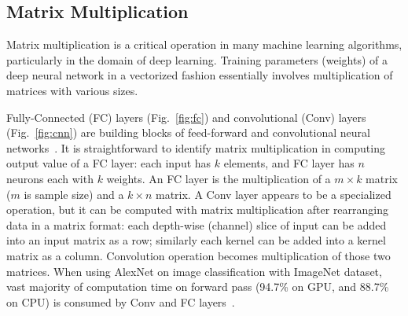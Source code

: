 \subsection{Matrix Multiplication}
Matrix multiplication is a critical operation in many machine learning algorithms, particularly in the domain of deep learning. Training parameters (weights) of a deep neural network in a vectorized fashion essentially involves multiplication of matrices with various sizes. 

Fully-Connected (FC) layers (Fig.~\ref{fig:fc}) and convolutional (Conv) layers (Fig.~\ref{fig:cnn}) are building blocks of feed-forward and convolutional neural networks~\cite{Warden15}. It is straightforward to identify matrix multiplication in computing output value of a FC layer: each input has $k$ elements, and FC layer has $n$ neurons each with $k$ weights. An FC layer is the multiplication of a $m \times k$ matrix ($m$ is sample size) and a $k\times n$ matrix. A Conv layer appears to be a specialized operation, but it can be computed with matrix multiplication after rearranging data in a matrix format: each depth-wise (channel) slice of input can be added into an input matrix as a row; similarly each kernel can be added into a kernel matrix as a column. Convolution operation becomes multiplication of those two matrices. When using AlexNet on image classification with ImageNet dataset, vast majority of computation time on forward pass (94.7\% on GPU, and 88.7\% on CPU) is consumed by Conv and FC layers~\cite{Jia14}.

